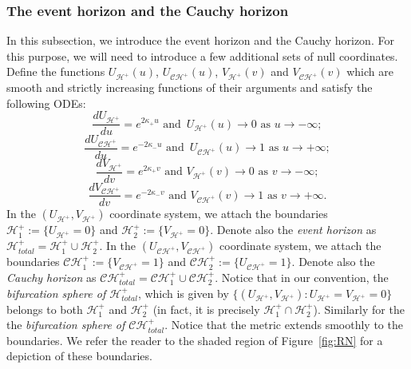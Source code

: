 \documentclass[10pt, reqno]{amsart}
\theoremstyle{definition}
\theoremstyle{remark}
\numberwithin{equation}{section}
\newcommand{\0}{\emptyset}
\newcommand{\calC}{\mathcal C}
\newcommand{\calH}{\mathcal H}
\newcommand{\f}{\frac}
\newcommand{\CH}{\calC \calH^{+}}		%
\newcommand{\EH}{\calH^{+}}
\begin{document}
\subsubsection{The event horizon and the Cauchy horizon}\label{sec.horizons}
In this subsection, we introduce the event horizon and the Cauchy horizon. For this purpose, we will need to introduce a few additional sets of null coordinates. Define the functions $U_{\EH}(u)$, $U_{\CH}(u)$, $V_{\EH}(v)$ and $V_{\CH}(v)$ which are smooth and strictly increasing functions of their arguments and satisfy the following ODEs:
\begin{equation}\label{U.EH.def}
\f{dU_{\EH}}{du}=e^{2\kappa_+ u} \mbox{ and }\, U_{\EH}(u)\to 0 \mbox{ as }u\to -\infty;
\end{equation}
\begin{equation}\label{U.CH.def}
\f{dU_{\CH}}{du}=e^{-2\kappa_- u} \mbox{ and }\, U_{\CH}(u)\to 1 \mbox{ as }u\to +\infty;
\end{equation}
\begin{equation}\label{V.EH.def}
\f{dV_{\EH}}{dv}=e^{2\kappa_+ v}\mbox{ and }V_{\EH}(v)\to 0\mbox{ as }v\to -\infty;
\end{equation}
\begin{equation}\label{V.CH.def}
\f{dV_{\CH}}{dv}=e^{-2\kappa_- v}\mbox{ and }V_{\CH}(v)\to 1\mbox{ as }v\to +\infty.
\end{equation}
In the $(U_{\EH},V_{\EH})$ coordinate system, we attach the boundaries $\EH_1:=\{U_{\EH}=0\}$ and $\EH_2:=\{V_{\EH}=0\}$. Denote also the \emph{event horizon} as $\EH_{total}=\EH_1\cup\EH_2$. In the $(U_{\CH},V_{\CH})$ coordinate system, we attach the boundaries $\CH_1:=\{V_{\CH}=1\}$ and $\CH_2 :=\{U_{\CH}=1\}$. Denote also the \emph{Cauchy horizon} as $\CH_{total}=\CH_1\cup\CH_2$. Notice that in our convention, the \emph{bifurcation sphere of $\EH_{total}$}, which is given by $\{(U_{\EH},V_{\EH}):U_{\EH}=V_{\EH}=0\}$ belongs to both $\EH_1$ and $\EH_2$ (in fact, it is precisely $\calH_{1}^{+} \cap \calH_{2}^{+}$). Similarly for the the \emph{bifurcation sphere of $\CH_{total}$}. Notice that the metric extends smoothly to the boundaries. We refer the reader to the shaded region of Figure~\ref{fig:RN} for a depiction of these boundaries.
\end{document}
